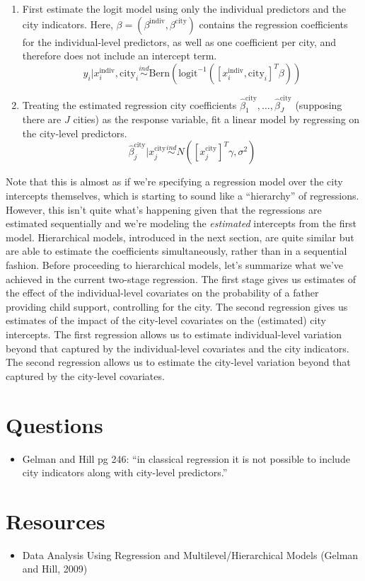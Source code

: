 \documentclass[12pt]{article}
\begin{document}
\begin{enumerate}
\item First estimate the logit model using only the individual predictors and the city indicators. Here, $\beta = (\beta^{\text{indiv}}, \beta^{\text{city}})$ contains the regression coefficients for the individual-level 
predictors, as well as one coefficient per city, and therefore does not include an intercept term. 
\[y_i|x_i^{\text{indiv}}, \text{city}_i \overset{ind}{\sim} \text{Bern}(\text{logit}^{-1}([x_i^{\text{indiv}}, \text{city}_i]^T \beta)) \]
\item Treating the estimated regression city coefficients $\hat{\beta}^{\text{city}}_1, \dots, \hat{\beta}^{\text{city}}_J$ (supposing there are $J$ cities) as the response variable, fit a linear model by regressing on the 
city-level predictors. 
\[\hat{\beta}^{\text{city}}_j|x_j^{\text{city}} \overset{ind}{\sim} N([x_j^{\text{city}}]^T \gamma, \sigma^2)\]
\end{enumerate}
Note that this is almost as if we're specifying a regression model over the city intercepts themselves, which is starting to sound like a ``hierarchy'' of regressions. However, this isn't quite what's happening given 
that the regressions are estimated sequentially and we're modeling the \textit{estimated} intercepts from the first model. Hierarchical models, introduced in the next section, are quite similar but are able to estimate
the coefficients simultaneously, rather than in a sequential fashion. Before proceeding to hierarchical models, let's summarize what we've achieved in the current two-stage regression. The first stage gives us estimates
of the effect of the individual-level covariates on the probability of a father providing child support, controlling for the city. The second regression gives us estimates of the impact of the city-level covariates on the (estimated) 
city intercepts. The first regression allows us to estimate individual-level variation beyond that captured by the individual-level covariates and the city indicators. The second regression allows us to estimate the city-level 
variation beyond that captured by the city-level covariates. 

\section{Questions}
\begin{itemize}
\item Gelman and Hill pg 246: ``in classical regression it is not possible to include city indicators along with city-level predictors.''
\end{itemize}

\section{Resources}
\begin{itemize}
\item Data Analysis Using Regression and Multilevel/Hierarchical Models (Gelman and Hill, 2009)
\end{itemize}
\end{document}
